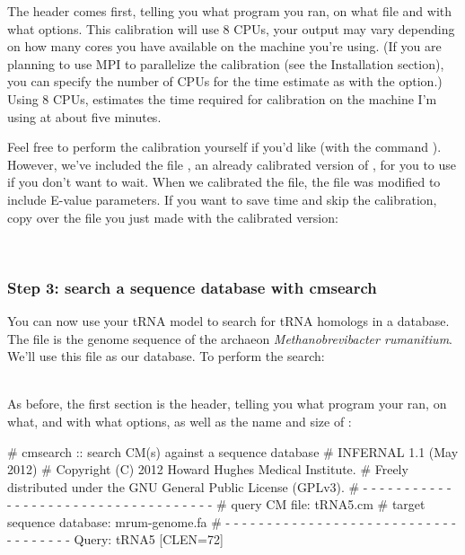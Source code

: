 The header comes first, telling you what program you ran, on what file
and with what options. This calibration will use 8 CPUs, your output
may vary depending on how many cores you have available on the machine
you're using. (If you are planning to use MPI to parallelize the
calibration (see the Installation section), you can specify the number
of CPUs for the time estimate as  with the  option.) Using 8 CPUs,  estimates the time
required for calibration on the machine I'm using at about five
minutes.

Feel free to perform the calibration yourself if you'd like (with the
command ). However, we've included the file
, an already calibrated version of ,
for you to use if you don't want to wait. When we calibrated the
 file, the file was modified to include E-value
parameters. If you want to save time and skip the calibration, 
copy over the  file you just made with the calibrated
version:
 
\\
 
\subsubsection{Step 3: search a sequence database with cmsearch}

You can now use your tRNA model to search for tRNA homologs in a
database. The file  is the genome sequence of the
archaeon \emph{Methanobrevibacter rumanitium}. We'll use this file as
our database. To perform the search:

\\

As before, the first section is the header, telling you what program
your ran, on what, and with what options, as well as the name and size
of :

\begin{sreoutput}
# cmsearch :: search CM(s) against a sequence database
# INFERNAL 1.1 (May 2012)
# Copyright (C) 2012 Howard Hughes Medical Institute.
# Freely distributed under the GNU General Public License (GPLv3).
# - - - - - - - - - - - - - - - - - - - - - - - - - - - - - - - - - - - -
# query CM file:                         tRNA5.cm
# target sequence database:              mrum-genome.fa
# - - - - - - - - - - - - - - - - - - - - - - - - - - - - - - - - - - - -
Query:       tRNA5  [CLEN=72]
\end{sreoutput}

